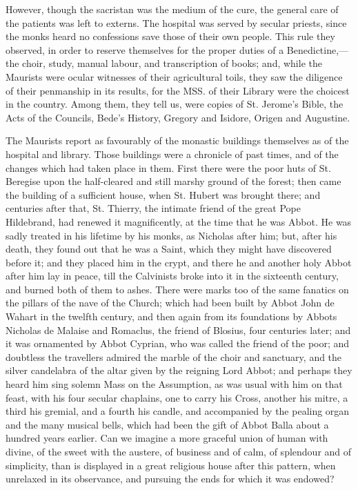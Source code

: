 However, though the sacristan was the medium of the cure, the
general care of the patients was left to externs. The hospital was
served by secular priests, since the monks heard no confessions save
those of their own people. This rule they observed, in order to
reserve themselves for the proper duties of a Benedictine,—the
choir, study, manual labour, and transcription of books; and, while
the Maurists were ocular witnesses of their agricultural toils, they
saw the diligence of their penmanship in its results, for the MSS. of
their Library were the choicest in the country. Among them, they tell
us, were copies of St. Jerome's Bible, the Acts of the Councils, Bede's
History, Gregory and Isidore, Origen and Augustine.

The Maurists report as favourably of the monastic buildings
themselves as of the hospital and library. Those buildings were a
chronicle of past times, and of the changes which had taken place in
them. First there were the poor huts of St. Beregise upon the
half-cleared and still marshy ground of the forest; then came the
building of a sufficient house, when St. Hubert was brought there; and
centuries after that, St. Thierry, the intimate friend of the great
Pope Hildebrand, had renewed it magnificently, at the time that he was
Abbot. He was sadly treated in his lifetime by his monks, as Nicholas
after him; but, after his death, they found out that he was a Saint,
which they might have discovered before it; and they placed him in the
crypt, and there he and another holy Abbot after him lay in peace,
till the Calvinists broke into it in the sixteenth century, and burned
both of them to ashes. There were marks too of the same fanatics on
the pillars of the nave of the Church; which had been built by Abbot
John de Wahart in the twelfth century, and then again from its
foundations by Abbots Nicholas de Malaise and Romaclus, the friend of
Blosius, four centuries later; and it was ornamented by Abbot Cyprian,
who was called the friend of the poor; and doubtless the travellers
admired the marble of the choir and sanctuary, and the silver
candelabra of the altar given by the reigning Lord Abbot; and perhaps
they heard him sing solemn Mass on the Assumption, as was usual with
him on that feast, with his four secular chaplains, one to carry his
Cross, another his mitre, a third his gremial, and a fourth his
candle, and accompanied by the pealing organ and the many musical
bells, which had been the gift of Abbot Balla about a hundred years
earlier. Can we imagine a more graceful union of human with divine, of
the sweet with the austere, of business and of calm, of splendour and
of simplicity, than is displayed in a great religious house after this
pattern, when unrelaxed in its observance, and pursuing the ends for
which it was endowed?

